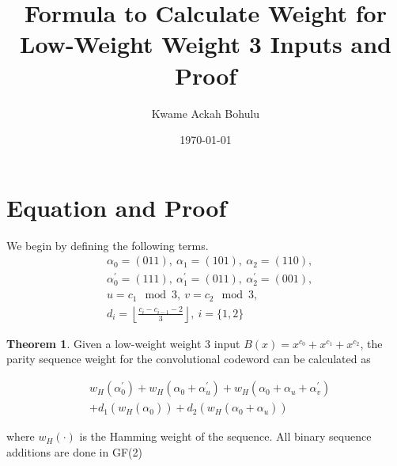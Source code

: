 \documentclass[fontsize=12pt]{article}
\title{Formula to Calculate Weight for Low-Weight Weight 3 Inputs and Proof}
\author{Kwame Ackah Bohulu}
\date{\today}
\theoremstyle{definition}
\newtheorem{theorem}{Theorem}[section]
\begin{document}
\maketitle

\newpage


\section{Equation and Proof}
We begin by defining the following terms.
\begin{equation}
\begin{aligned}
&\alpha_0= (0 1 1),~\alpha_1= (1 0 1 ),~\alpha_2= (1 1 0),\\
&\alpha_0^{'}= (1 1 1),~\alpha_1^{'}= (0 1 1),~\alpha_2^{'}= (0 0 1),\\
& u= c_1 \mod 3,~v= c_2 \mod 3,\\
&d_i =\left \lfloor{\frac{c_i -c_{i-1} -2}{3}}\right \rfloor,~i=\{1,2\}
\end{aligned}
\end{equation}
\begin{theorem}

Given a low-weight weight 3 input $B(x)=x^{c_0}+x^{c_1}+x^{c_2}$, the parity sequence weight for the convolutional codeword can be calculated as 

\begin{equation}
\begin{aligned}
&w_H(\alpha^{'}_0)+w_H(\alpha_0+\alpha^{'}_u)+w_H(\alpha_0+\alpha^{}_u
+\alpha^{'}_v)\\
&+d_1\left(w_H(\alpha^{}_0)\right)+d_2\left(w_H(\alpha^{}_0 + \alpha^{}_u)\right)
\end{aligned}
\end{equation}

\end{theorem}
where $w_H(\cdot)$ is the Hamming weight of the sequence. All binary sequence additions are done in GF(2)
\end{document}
